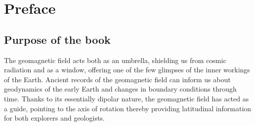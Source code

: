 \documentclass[draft,plain]{tauxe}
\begin{document}
\frontmatter






\tableofcontents

\chapter*{Preface}


\section*{Purpose of the book}

The geomagnetic field acts both as an umbrella, shielding us from cosmic radiation and as a window,
offering one of the few glimpses of the inner workings of the Earth. Ancient records of the
geomagnetic field can inform us about geodynamics of the early Earth and changes in boundary
conditions through time. Thanks to its essentially dipolar nature, the geomagnetic field has acted as
a guide, pointing to the axis of rotation thereby providing latitudinal information for both explorers
and geologists.
\end{document}
